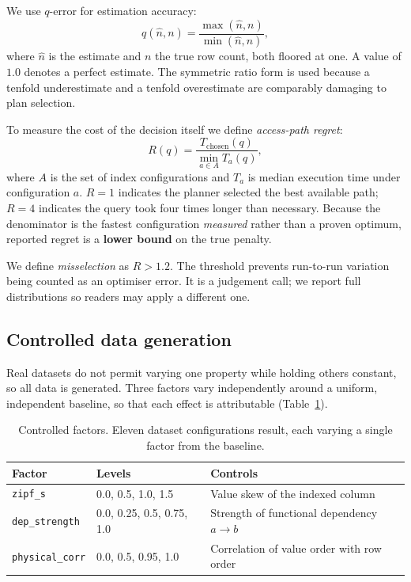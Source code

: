 \documentclass[preprint,12pt,authoryear]{elsarticle}
\begin{document}
We use $q$-error \citep{moerkotte2009preventing} for estimation
accuracy:
\begin{equation}
q(\hat{n}, n) = \frac{\max(\hat{n}, n)}{\min(\hat{n}, n)},
\end{equation}
where $\hat{n}$ is the estimate and $n$ the true row count, both floored
at one. A value of $1.0$ denotes a perfect estimate. The symmetric
ratio form is used because a tenfold underestimate and a tenfold
overestimate are comparably damaging to plan selection.

To measure the cost of the decision itself we define \emph{access-path
regret}:
\begin{equation}
R(q) = \frac{T_{\mathrm{chosen}}(q)}{\min_{a \in A} T_a(q)},
\label{eq:regret}
\end{equation}
where $A$ is the set of index configurations and $T_a$ is median
execution time under configuration $a$. $R = 1$ indicates the planner
selected the best available path; $R = 4$ indicates the query took four
times longer than necessary. Because the denominator is the fastest
configuration \emph{measured} rather than a proven optimum, reported
regret is a \textbf{lower bound} on the true penalty.

We define \emph{misselection} as $R > 1.2$. The threshold prevents
run-to-run variation being counted as an optimiser error. It is a
judgement call; we report full distributions so readers may apply a
different one.

\subsection{Controlled data generation}

Real datasets do not permit varying one property while holding others
constant, so all data is generated. Three factors vary independently
around a uniform, independent baseline, so that each effect is
attributable (Table~\ref{tab:factors}).

\begin{table}[htbp]
\centering
\caption{Controlled factors. Eleven dataset configurations result, each
varying a single factor from the baseline.}
\label{tab:factors}
\small
\begin{tabular}{@{}lll@{}}
\toprule
Factor & Levels & Controls \\
\midrule
\texttt{zipf\_s} & 0.0, 0.5, 1.0, 1.5 & Value skew of the indexed column \\
\texttt{dep\_strength} & 0.0, 0.25, 0.5, 0.75, 1.0 & Strength of functional dependency $a \rightarrow b$ \\
\texttt{physical\_corr} & 0.0, 0.5, 0.95, 1.0 & Correlation of value order with row order \\
\bottomrule
\end{tabular}
\end{table}
\end{document}
